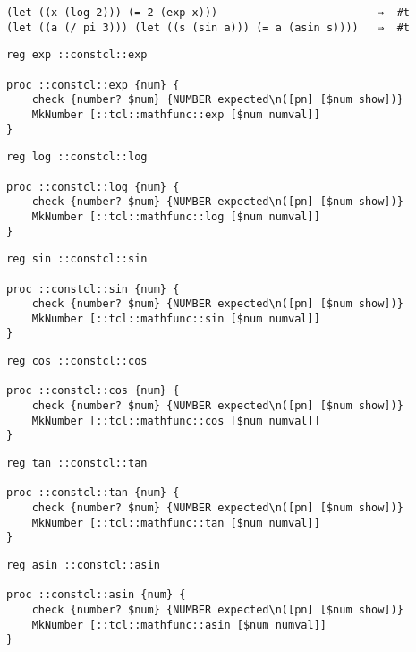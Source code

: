 \documentclass{report}
\begin{document}
\noindent\makebox[\linewidth]{\rule{\linewidth}{0.4pt}}
\begin{lstlisting}
(let ((x (log 2))) (= 2 (exp x)))                         ⇒  #t
(let ((a (/ pi 3))) (let ((s (sin a))) (= a (asin s))))   ⇒  #t
\end{lstlisting}
\noindent\makebox[\linewidth]{\rule{\linewidth}{0.4pt}}
\noindent\makebox[\linewidth]{\rule{\linewidth}{0.4pt}}
\begin{lstlisting}
reg exp ::constcl::exp
 
proc ::constcl::exp {num} {
    check {number? $num} {NUMBER expected\n([pn] [$num show])}
    MkNumber [::tcl::mathfunc::exp [$num numval]]
}
\end{lstlisting}
\noindent\makebox[\linewidth]{\rule{\linewidth}{0.4pt}}
\noindent\makebox[\linewidth]{\rule{\linewidth}{0.4pt}}
\begin{lstlisting}
reg log ::constcl::log
 
proc ::constcl::log {num} {
    check {number? $num} {NUMBER expected\n([pn] [$num show])}
    MkNumber [::tcl::mathfunc::log [$num numval]]
}
\end{lstlisting}
\noindent\makebox[\linewidth]{\rule{\linewidth}{0.4pt}}
\noindent\makebox[\linewidth]{\rule{\linewidth}{0.4pt}}
\begin{lstlisting}
reg sin ::constcl::sin
 
proc ::constcl::sin {num} {
    check {number? $num} {NUMBER expected\n([pn] [$num show])}
    MkNumber [::tcl::mathfunc::sin [$num numval]]
}
\end{lstlisting}
\noindent\makebox[\linewidth]{\rule{\linewidth}{0.4pt}}
\noindent\makebox[\linewidth]{\rule{\linewidth}{0.4pt}}
\begin{lstlisting}
reg cos ::constcl::cos
 
proc ::constcl::cos {num} {
    check {number? $num} {NUMBER expected\n([pn] [$num show])}
    MkNumber [::tcl::mathfunc::cos [$num numval]]
}
\end{lstlisting}
\noindent\makebox[\linewidth]{\rule{\linewidth}{0.4pt}}
\noindent\makebox[\linewidth]{\rule{\linewidth}{0.4pt}}
\begin{lstlisting}
reg tan ::constcl::tan
 
proc ::constcl::tan {num} {
    check {number? $num} {NUMBER expected\n([pn] [$num show])}
    MkNumber [::tcl::mathfunc::tan [$num numval]]
}
\end{lstlisting}
\noindent\makebox[\linewidth]{\rule{\linewidth}{0.4pt}}
\noindent\makebox[\linewidth]{\rule{\linewidth}{0.4pt}}
\begin{lstlisting}
reg asin ::constcl::asin
 
proc ::constcl::asin {num} {
    check {number? $num} {NUMBER expected\n([pn] [$num show])}
    MkNumber [::tcl::mathfunc::asin [$num numval]]
}
\end{lstlisting}
\end{document}
